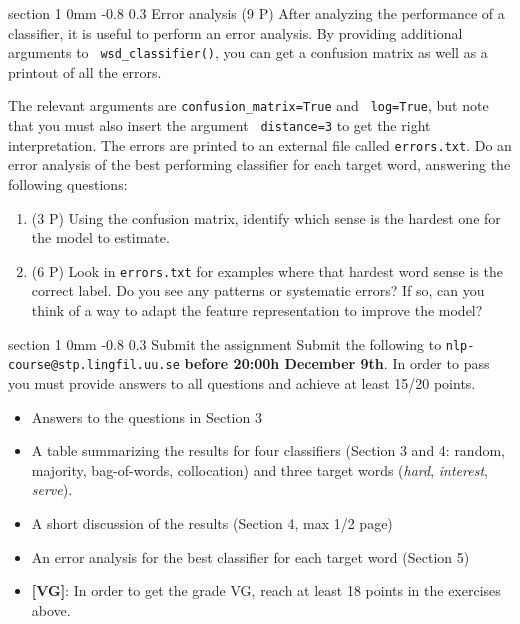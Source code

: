 \documentclass[11pt]{article}
\makeatletter
\newcommand{\newsec}[2]{\section{#1}\label{sec:#2}\noindent}
\renewcommand{\section}{\@startsection
{section}%
{1}%
{0mm}%
{-0.8\baselineskip}%
{0.3\baselineskip}%
{\bfseries\large}}%
\makeatother
\begin{document}
\newsec{Error analysis (9 P)}{submit}%
After analyzing the performance of a classifier, it is useful to
perform an error analysis. By providing additional arguments to {\tt
  wsd\_classifier()}, you can get a confusion matrix as well as a
printout of all the errors.
\begin{center}
\fbox{
\scalebox{0.55}{

}}
\end{center}
The relevant arguments are {\tt confusion\_matrix=True} and {\tt
  log=True}, but note that you must also insert the argument {\tt
  distance=3} to get the right interpretation. The errors are printed
to an external file called {\tt errors.txt}. Do an error analysis of
the best performing classifier for each target word, answering the
following questions:
\begin{enumerate}
\item (3 P) Using the confusion matrix, identify which sense is the hardest
  one for the model to estimate.
\item (6 P) Look in {\tt errors.txt} for examples where that hardest word
  sense is the correct label.  Do you see any patterns or systematic
  errors? If so, can you think of a way to adapt the feature
  representation to improve the model?
\end{enumerate}
\newsec{Submit the assignment}{submit}%
Submit the following to {\tt nlp-course@stp.lingfil.uu.se}
\textbf{before 20:00h December 9th}. In order to pass you must provide
answers to all questions and achieve at least 15/20 points.
\begin{itemize}[noitemsep,topsep=0.2cm]
\item Answers to the questions in Section 3
\item A table summarizing the results for four classifiers (Section 3
  and 4: random, majority, bag-of-words, collocation) and three target
  words (\emph{hard}, \emph{interest}, \emph{serve}).
\item A short discussion of the results (Section 4, max 1/2 page)
\item An error analysis for the best classifier for each target word (Section 5)
\item \textbf{[VG]}: In order to get the grade VG, reach at least 18
  points in the exercises above.
\end{itemize}
\end{document}
